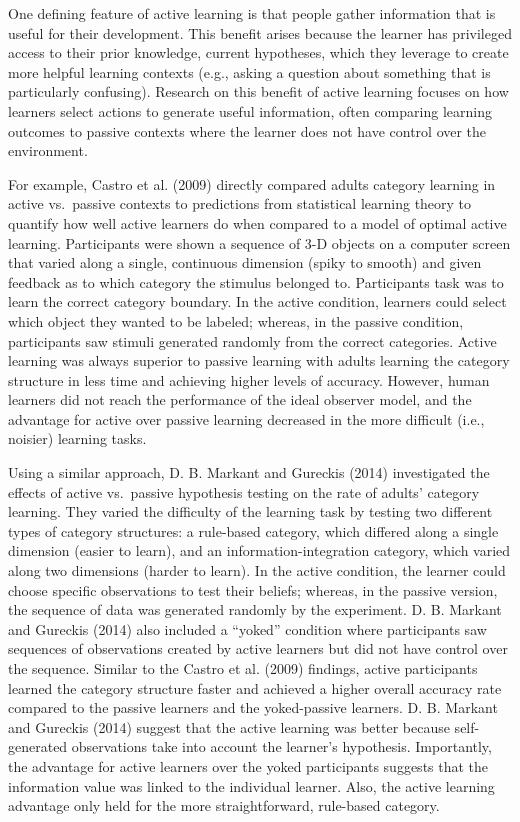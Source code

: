 \documentclass[english,floatsintext,man]{apa6}
\theoremstyle{definition}
\theoremstyle{definition}
\theoremstyle{definition}
\theoremstyle{remark}
\begin{document}
One defining feature of active learning is that people gather
information that is useful for their development. This benefit arises
because the learner has privileged access to their prior knowledge,
current hypotheses, which they leverage to create more helpful learning
contexts (e.g., asking a question about something that is particularly
confusing). Research on this benefit of active learning focuses on how
learners select actions to generate useful information, often comparing
learning outcomes to passive contexts where the learner does not have
control over the environment.

For example, Castro et al. (2009) directly compared adults category
learning in active vs.~passive contexts to predictions from statistical
learning theory to quantify how well active learners do when compared to
a model of optimal active learning. Participants were shown a sequence
of 3-D objects on a computer screen that varied along a single,
continuous dimension (spiky to smooth) and given feedback as to which
category the stimulus belonged to. Participants task was to learn the
correct category boundary. In the active condition, learners could
select which object they wanted to be labeled; whereas, in the passive
condition, participants saw stimuli generated randomly from the correct
categories. Active learning was always superior to passive learning with
adults learning the category structure in less time and achieving higher
levels of accuracy. However, human learners did not reach the
performance of the ideal observer model, and the advantage for active
over passive learning decreased in the more difficult (i.e., noisier)
learning tasks.

Using a similar approach, D. B. Markant and Gureckis (2014) investigated
the effects of active vs.~passive hypothesis testing on the rate of
adults' category learning. They varied the difficulty of the learning
task by testing two different types of category structures: a rule-based
category, which differed along a single dimension (easier to learn), and
an information-integration category, which varied along two dimensions
(harder to learn). In the active condition, the learner could choose
specific observations to test their beliefs; whereas, in the passive
version, the sequence of data was generated randomly by the experiment.
D. B. Markant and Gureckis (2014) also included a \enquote{yoked}
condition where participants saw sequences of observations created by
active learners but did not have control over the sequence. Similar to
the Castro et al. (2009) findings, active participants learned the
category structure faster and achieved a higher overall accuracy rate
compared to the passive learners and the yoked-passive learners. D. B.
Markant and Gureckis (2014) suggest that the active learning was better
because self-generated observations take into account the learner's
hypothesis. Importantly, the advantage for active learners over the
yoked participants suggests that the information value was linked to the
individual learner. Also, the active learning advantage only held for
the more straightforward, rule-based category.
\end{document}

